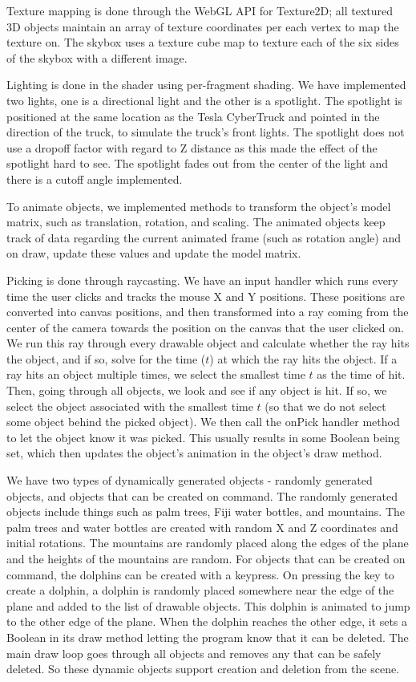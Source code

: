 \documentclass[10pt,letterpaper,oneside]{article}
\numberwithin{equation}{section}		%
\numberwithin{figure}{section}			%
\numberwithin{table}{section}				%
\begin{document}
Texture mapping is done through the WebGL API for Texture2D; all textured 3D objects maintain an array of texture coordinates per each vertex to map the texture on. The skybox uses a texture cube map to texture each of the six sides of the skybox with a different image.

Lighting is done in the shader using per-fragment shading. We have implemented two lights, one is a directional light and the other is a spotlight. The spotlight is positioned at the same location as the Tesla CyberTruck and pointed in the direction of the truck, to simulate the truck's front lights. The spotlight does not use a dropoff factor with regard to Z distance as this made the effect of the spotlight hard to see. The spotlight fades out from the center of the light and there is a cutoff angle implemented.

To animate objects, we implemented methods to transform the object's model matrix, such as translation, rotation, and scaling. The animated objects keep track of data regarding the current animated frame (such as rotation angle) and on draw, update these values and update the model matrix.

Picking is done through raycasting. We have an input handler which runs every time the user clicks and tracks the mouse X and Y positions. These positions are converted into canvas positions, and then transformed into a ray coming from the center of the camera towards the position on the canvas that the user clicked on. We run this ray through every drawable object and calculate whether the ray hits the object, and if so, solve for the time ($t$) at which the ray hits the object. If a ray hits an object multiple times, we select the smallest time $t$ as the time of hit. Then, going through all objects, we look and see if any object is hit. If so, we select the object associated with the smallest time $t$ (so that we do not select some object behind the picked object). We then call the onPick handler method to let the object know it was picked. This usually results in some Boolean being set, which then updates the object's animation in the object's draw method.

We have two types of dynamically generated objects - randomly generated objects, and objects that can be created on command. The randomly generated objects include things such as palm trees, Fiji water bottles, and mountains. The palm trees and water bottles are created with random X and Z coordinates and initial rotations. The mountains are randomly placed along the edges of the plane and the heights of the mountains are random. For objects that can be created on command, the dolphins can be created with a keypress. On pressing the key to create a dolphin, a dolphin is randomly placed somewhere near the edge of the plane and added to the list of drawable objects. This dolphin is animated to jump to the other edge of the plane. When the dolphin reaches the other edge, it sets a Boolean in its draw method letting the program know that it can be deleted. The main draw loop goes through all objects and removes any that can be safely deleted. So these dynamic objects support creation and deletion from the scene.
\end{document}
